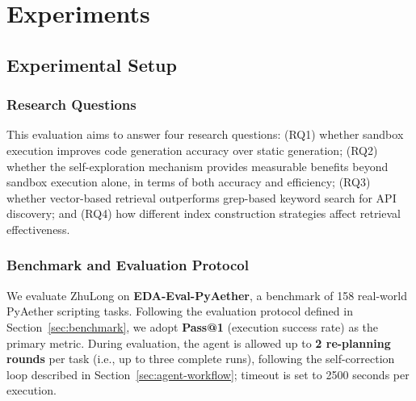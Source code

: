 \section{Experiments}
\label{sec:experiments}

\subsection{Experimental Setup}
\label{sec:exp-setup}

\subsubsection{Research Questions}

This evaluation aims to answer four research questions: (RQ1) whether sandbox execution improves code generation accuracy over static generation; (RQ2) whether the self-exploration mechanism provides measurable benefits beyond sandbox execution alone, in terms of both accuracy and efficiency; (RQ3) whether vector-based retrieval outperforms grep-based keyword search for API discovery; and (RQ4) how different index construction strategies affect retrieval effectiveness.

\subsubsection{Benchmark and Evaluation Protocol}

We evaluate ZhuLong on \textbf{EDA-Eval-PyAether}, a benchmark of 158 real-world PyAether scripting tasks. Following the evaluation protocol defined in Section~\ref{sec:benchmark}, we adopt \textbf{Pass@1} (execution success rate) as the primary metric. During evaluation, the agent is allowed up to \textbf{2 re-planning rounds} per task (i.e., up to three complete runs), following the self-correction loop described in Section~\ref{sec:agent-workflow}; timeout is set to 2500 seconds per execution.

